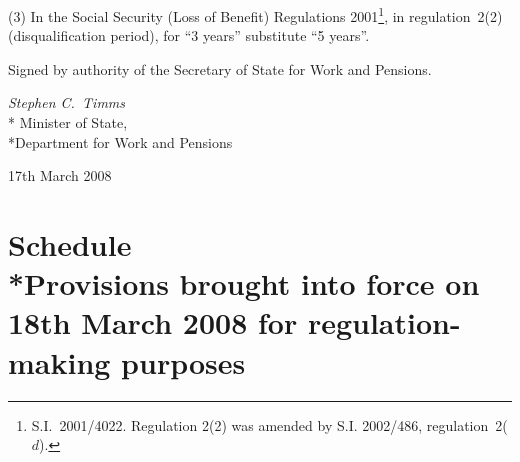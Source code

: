 \documentclass[12pt,a4paper]{article}
\begin{document}
(3) In the Social Security (Loss of Benefit) Regulations 2001\footnote{S.I.\ 2001/4022. Regulation 2(2) was amended by S.I. 2002/486, regulation~2($d$).}, in regulation~2(2) (disqualification period), for “3 years” substitute “5 years”. 

\bigskip

Signed 
by authority of the 
Secretary of State for Work and Pensions.

{\raggedleft
\emph{Stephen C.\ Timms}\\*
Minister
of State,\\*Department for Work and Pensions

}

17th March 2008

\small

\part[Schedule --- Provisions brought into force on 18th March 2008 for regulation-making purposes]{Schedule\\*Provisions brought into force on 18th March 2008 for regulation-making purposes}
\end{document}
